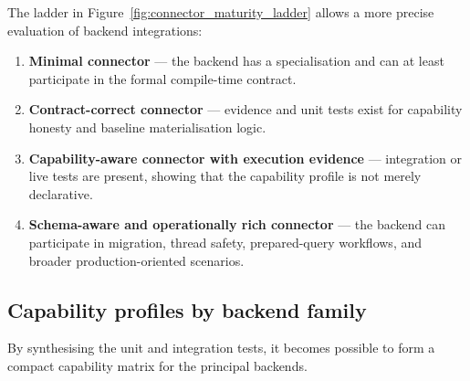 The ladder in Figure~\ref{fig:connector_maturity_ladder} allows a more precise evaluation of backend integrations:

\begin{enumerate}[label=\arabic*.]
    \item \textbf{Minimal connector} --- the backend has a  specialisation and can at least participate in the formal compile-time contract.
    \item \textbf{Contract-correct connector} ---  evidence and unit tests exist for capability honesty and baseline materialisation logic.
    \item \textbf{Capability-aware connector with execution evidence} --- integration or live tests are present, showing that the capability profile is not merely declarative.
    \item \textbf{Schema-aware and operationally rich connector} --- the backend can participate in migration, thread safety, prepared-query workflows, and broader production-oriented scenarios.
\end{enumerate}

\subsection{Capability profiles by backend family}

By synthesising the unit and integration tests, it becomes possible to form a compact capability matrix for the principal backends.

